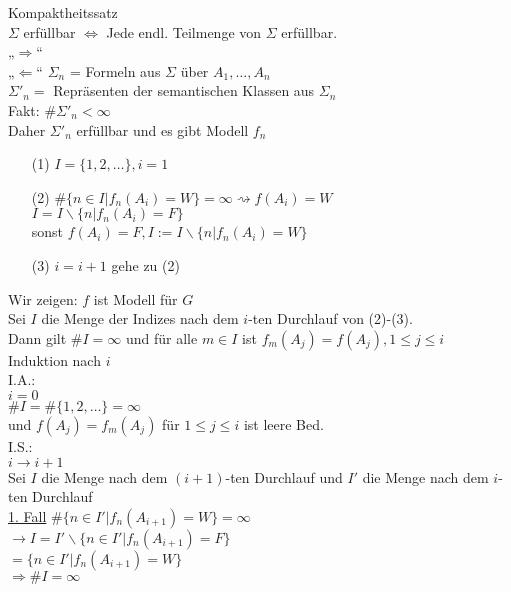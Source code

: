 

Kompaktheitssatz\\
$\Sigma$ erfüllbar $\Leftrightarrow$ Jede endl. Teilmenge von $\Sigma$ erfüllbar.\\

\beweis{}
„$\Rightarrow$“\\
„$\Leftarrow$“ $\Sigma_n$ = Formeln aus $\Sigma$ über $A_1, …, A_n$\\
$\Sigma'_n =$ Repräsenten der semantischen Klassen aus $\Sigma_n$\\

Fakt: $\# \Sigma'_n < \infty$\\
Daher $\Sigma'_n$ erfüllbar und es gibt Modell $f_n$

\begin{enumerate}
\item[(1)] $I = \{1, 2, … \}, i=1$

\item[(2)] $\# \{ n \in I | f_n(A_i)=W \} = \infty \rightsquigarrow f(A_i) = W$\\
$I= I \backslash \{ n | f_n(A_i) = F \}$\\
sonst $f(A_i)=F, I:= I \backslash \{ n | f_n(A_i) = W \}$

\item[(3)] $i=i+1$ gehe zu (2)
\end{enumerate}

Wir zeigen: $f$ ist Modell für $G$\\

\behauptung{}
Sei $I$ die Menge der Indizes nach dem $i$-ten Durchlauf von (2)-(3).\\
Dann gilt $\# I = \infty$ und für alle $m \in I$ ist $f_m (A_j) = f(A_j), 1 \leq j \leq i$\\

\beweis{}
Induktion nach $i$\\
I.A.:\\
$i=0$\\
$\# I = \# \{ 1, 2, … \} = \infty$\\
und $f(A_j) = f_m(A_j)$ für $1 \leq j \leq i$ ist leere Bed.\\

I.S.:\\
$i \rightarrow i+1$\\
Sei $I$ die Menge nach dem $(i+1)$-ten Durchlauf und $I'$ die Menge nach dem $i$-ten Durchlauf\\

\underline{1. Fall} $\# \{ n \in I' | f_n(A_{i+1}) = W \} = \infty$\\
$\rightarrow I = I' \backslash \{ n \in I' | f_n(A_{i+1}) = F \}$\\
$= \{ n \in I' | f_n(A_{i+1}) = W \}$\\
$\Rightarrow \# I=\infty$\\

